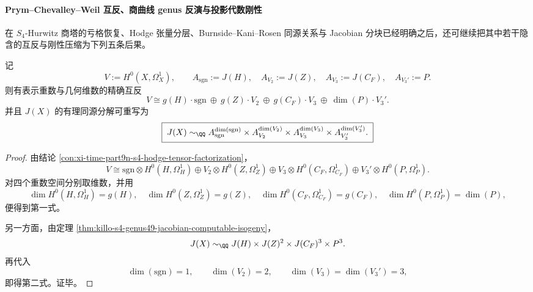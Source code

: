 \paragraph{Prym--Chevalley--Weil 互反、商曲线 genus 反演与投影代数刚性}
在 \(S_4\)-Hurwitz 商塔的亏格恢复、Hodge 张量分层、Burnside--Kani--Rosen 同源关系与 Jacobian 分块已经明确之后，还可继续把其中若干隐含的互反与刚性压缩为下列五条后果。

\begin{theorem}\label{thm:xi-time-part9n1b-prym-chevalley-weil-reciprocity}
记
\[
V:=H^0(X,\Omega_X^1),
\qquad
A_{\mathrm{sgn}}:=J(H),\quad
A_{V_2}:=J(Z),\quad
A_{V_3}:=J(C_F),\quad
A_{V_3'}:=P.
\]
则有表示重数与几何维数的精确互反
\[
\boxed{\;
V\cong
g(H)\cdot \mathrm{sgn}\ \oplus\
g(Z)\cdot V_2\ \oplus\
g(C_F)\cdot V_3\ \oplus\
\dim(P)\cdot V_3'.\;}
\]
并且 \(J(X)\) 的有理同源分解可重写为
\[
\boxed{\;
J(X)\sim_{\QQ}
A_{\mathrm{sgn}}^{\dim(\mathrm{sgn})}\times
A_{V_2}^{\dim(V_2)}\times
A_{V_3}^{\dim(V_3)}\times
A_{V_3'}^{\dim(V_3')}. \;}
\]
\end{theorem}
\begin{proof}
由结论 \ref{con:xi-time-part9n-s4-hodge-tensor-factorization}，
\[
V\cong
\mathrm{sgn}\otimes H^0(H,\Omega_H^1)
\oplus
V_2\otimes H^0(Z,\Omega_Z^1)
\oplus
V_3\otimes H^0(C_F,\Omega_{C_F}^1)
\oplus
V_3'\otimes H^0(P,\Omega_P^1).
\]
对四个重数空间分别取维数，并用
\[
\dim H^0(H,\Omega_H^1)=g(H),\quad
\dim H^0(Z,\Omega_Z^1)=g(Z),\quad
\dim H^0(C_F,\Omega_{C_F}^1)=g(C_F),\quad
\dim H^0(P,\Omega_P^1)=\dim(P),
\]
便得到第一式。

另一方面，由定理 \ref{thm:killo-s4-genus49-jacobian-computable-isogeny}，
\[
J(X)\sim_{\QQ}J(H)\times J(Z)^2\times J(C_F)^3\times P^3.
\]
再代入
\[
\dim(\mathrm{sgn})=1,\qquad \dim(V_2)=2,\qquad \dim(V_3)=\dim(V_3')=3,
\]
即得第二式。证毕。
\end{proof}

